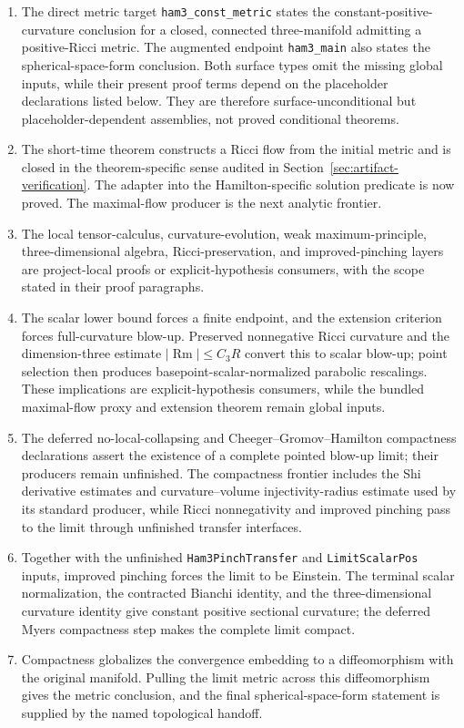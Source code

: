 \documentclass[11pt]{article}
\theoremstyle{plain}
\theoremstyle{definition}
\theoremstyle{remark}
\newcommand{\Rm}{\operatorname{Rm}}
\newcommand{\norm}[1]{\left|#1\right|}
\newcommand{\leanref}[1]{\nolinkurl{#1}}
\begin{document}
\begin{enumerate}[leftmargin=2em]
  \item The direct metric target \leanref{ham3_const_metric} states the
  constant-positive-curvature conclusion for a closed, connected
  three-manifold admitting a positive-Ricci metric.  The augmented endpoint
  \leanref{ham3_main} also states the spherical-space-form conclusion.  Both
  surface types omit the missing global inputs, while their present proof terms
  depend on the placeholder declarations listed below.  They are therefore
  surface-unconditional but placeholder-dependent assemblies, not proved
  conditional theorems.
  \item The short-time theorem constructs a Ricci flow from the initial metric
  and is closed in the theorem-specific sense audited in
  Section~\ref{sec:artifact-verification}.  The adapter into the
  Hamilton-specific solution predicate is now proved.  The maximal-flow
  producer is the next analytic frontier.
  \item The local tensor-calculus, curvature-evolution, weak
  maximum-principle, three-dimensional algebra, Ricci-preservation, and
  improved-pinching layers are project-local proofs or
  explicit-hypothesis consumers, with the scope stated in their proof
  paragraphs.
  \item The scalar lower bound forces a finite endpoint, and the extension
  criterion forces full-curvature blow-up.  Preserved nonnegative Ricci
  curvature and the dimension-three estimate \(\norm{\Rm}\le C_3R\) convert
  this to scalar blow-up; point selection then produces basepoint-scalar-normalized parabolic
  rescalings.  These implications are explicit-hypothesis consumers, while the
  bundled maximal-flow proxy and
  extension theorem remain global inputs.
  \item The deferred no-local-collapsing and Cheeger--Gromov--Hamilton
  compactness declarations assert the existence of a complete pointed blow-up
  limit; their producers remain unfinished.  The compactness frontier includes
  the Shi derivative estimates and curvature--volume injectivity-radius
  estimate used by its standard producer, while Ricci nonnegativity and
  improved pinching pass to the limit through unfinished transfer interfaces.
  \item Together with the unfinished \leanref{Ham3PinchTransfer} and
  \leanref{LimitScalarPos} inputs, improved pinching forces the limit to be
  Einstein.  The terminal
  scalar normalization, the contracted Bianchi identity, and the
  three-dimensional curvature identity give constant positive sectional
  curvature; the deferred Myers compactness step makes the complete limit
  compact.
  \item Compactness globalizes the convergence embedding to a diffeomorphism
  with the original manifold.  Pulling the limit metric across this
  diffeomorphism gives the metric conclusion, and the final
  spherical-space-form statement is supplied by the named topological
  handoff.
\end{enumerate}
\end{document}
